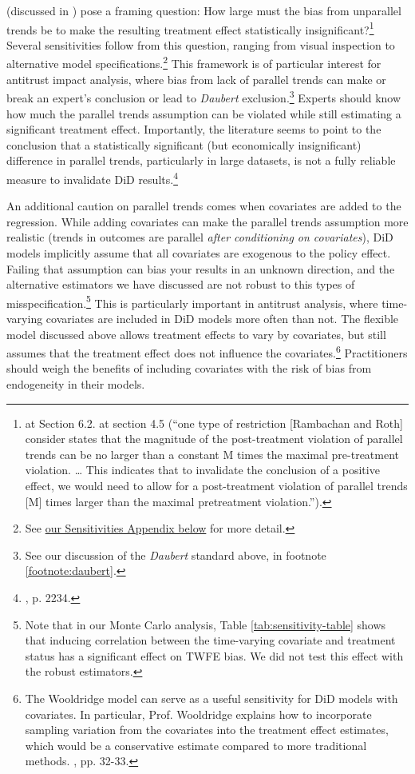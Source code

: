 \documentclass[12pt]{article}
\begin{document}
\citet{rambachan2023more} (discussed in \citet{roth2023s}) pose a framing question: How large must the bias from unparallel trends be to make the resulting treatment effect statistically insignificant?\footnote{\citet{rambachan2023more} at Section 6.2. \citet{roth2023s} at section 4.5 (“one type of restriction [Rambachan and Roth] consider states that the magnitude of the post-treatment violation of parallel trends can be no larger than a constant M times the maximal pre-treatment violation. … This indicates that to invalidate the conclusion of a positive effect, we would need to allow for a post-treatment violation of parallel trends [M] times larger than the maximal pretreatment violation.”).}  Several sensitivities follow from this question, ranging from visual inspection to alternative model specifications.\footnote{See \hyperref[sec:appendixa]{our Sensitivities Appendix below} for more detail.}  This framework is of particular interest for antitrust impact analysis, where bias from lack of parallel trends can make or break an expert’s conclusion or lead to \textit{Daubert} exclusion.\footnote{See our discussion of the \textit{Daubert} standard above, in footnote \ref{footnote:daubert}.} Experts should know how much the parallel trends assumption can be violated while still estimating a significant treatment effect. Importantly, the literature seems to point to the conclusion that a statistically significant (but economically insignificant) difference in parallel trends, particularly in large datasets, is not a fully reliable measure to invalidate DiD results.\footnote{\citet{roth2023s}, p. 2234.}

An additional caution on parallel trends comes when covariates are added to the regression. While adding covariates can make the parallel trends assumption more realistic (trends in outcomes are parallel \textit{after conditioning on covariates}), DiD models implicitly assume that all covariates are exogenous to the policy effect. Failing that assumption can bias your results in an unknown direction, and the alternative estimators we have discussed are not robust to this types of misspecification.\footnote{Note that in our Monte Carlo analysis, Table \ref{tab:sensitivity-table} shows that inducing correlation between the time-varying covariate and treatment status has a significant effect on TWFE bias. We did not test this effect with the robust estimators.} This is particularly important in antitrust analysis, where time-varying covariates are included in DiD models more often than not. The flexible \citet{wooldridge2021two} model discussed above allows treatment effects to vary by covariates, but still assumes that the treatment effect does not influence the covariates.\footnote{The Wooldridge model can serve as a useful sensitivity for DiD models with covariates. In particular, Prof. Wooldridge explains how to incorporate sampling variation from the covariates into the treatment effect estimates, which would be a conservative estimate compared to more traditional methods. \citet{wooldridge2021two}, pp. 32-33.} Practitioners should weigh the benefits of including covariates with the risk of bias from endogeneity in their models.
\end{document}
